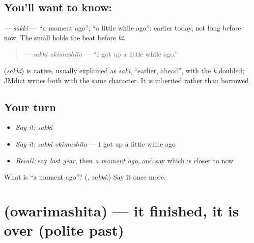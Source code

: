\subsection*{You'll want to know: }
\textbf{} — \emph{sakki} — \textquotedblleft{}a moment ago\textquotedblright{}, \textquotedblleft{}a little while ago\textquotedblright{}: earlier today, not long before now. The small \textbf{} holds the beat before \emph{ki}.

\begin{quote}
\textbf{ } — \emph{sakki okimashita} — \textquotedblleft{}I got up a little while ago.\textquotedblright{}
\end{quote}

\begin{cousinweb}
\textbf{} (\emph{sakki}) is native, usually explained as \emph{saki}, \textquotedblleft{}earlier, ahead\textquotedblright{}, with the \emph{k} doubled; JMdict writes both with the same character. It is inherited rather than borrowed.
\end{cousinweb}

\subsection*{Your turn}
\begin{itemize}
\raggedright
  \item \emph{Say it:} \emph{sakki}
  \item \emph{Say it:} \emph{sakki okimashita} — I got up a little while ago
  \item \emph{Recall:} say \emph{last year}, then \emph{a moment ago}, and say which is closer to now
\end{itemize}

\begin{tcolorbox}[breakable,colback=teal!4,colframe=teal!35!black,title={Before you move on}]
What is \textquotedblleft{}a moment ago\textquotedblright{}? (\textbf{}, \emph{sakki}.) Say it once more.
\end{tcolorbox}
\section[\texorpdfstring{\ja{おわりました} (owarimashita)}{おわりました (owarimashita)}]{ (owarimashita) — it finished, it is over (polite past)}

\label{lesson:JA-C140-owarimashita}



